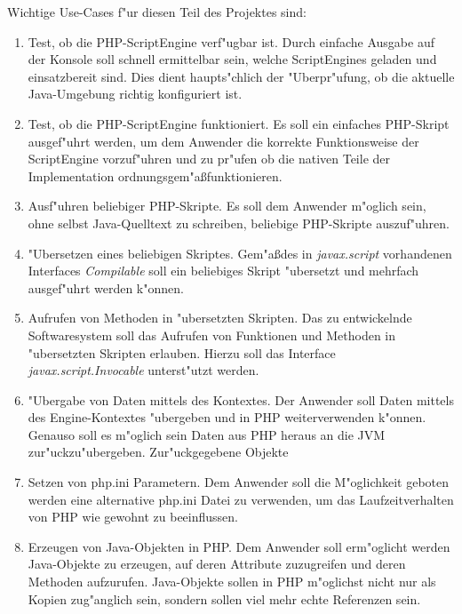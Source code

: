 Wichtige Use-Cases f"ur diesen Teil des Projektes sind:
\begin{enumerate}
\item Test, ob die PHP-ScriptEngine verf"ugbar ist. Durch einfache Ausgabe auf der Konsole soll schnell ermittelbar sein, welche
    ScriptEngines geladen und einsatzbereit sind. Dies dient haupts"chlich der "Uberpr"ufung, ob die aktuelle Java-Umgebung
    richtig konfiguriert ist.
\item Test, ob die PHP-ScriptEngine funktioniert. Es soll ein einfaches PHP-Skript ausgef"uhrt werden, um dem Anwender
    die korrekte Funktionsweise der ScriptEngine vorzuf"uhren und zu pr"ufen ob die nativen Teile der Implementation
    ordnungsgem"a\ss funktionieren.
\item Ausf"uhren beliebiger PHP-Skripte. Es soll dem Anwender m"oglich sein, ohne selbst Java-Quelltext zu schreiben, beliebige
    PHP-Skripte auszuf"uhren.
\item "Ubersetzen eines beliebigen Skriptes. Gem"a\ss des in \emph{javax.script} vorhandenen Interfaces \emph{Compilable} soll 
    ein beliebiges Skript "ubersetzt und mehrfach ausgef"uhrt werden k"onnen.
\item Aufrufen von Methoden in "ubersetzten Skripten. Das zu entwickelnde Softwaresystem soll das Aufrufen von Funktionen und
    Methoden in "ubersetzten Skripten erlauben. Hierzu soll das Interface \emph{javax.script.Invocable} unterst"utzt werden.
\item "Ubergabe von Daten mittels des Kontextes. Der Anwender soll Daten mittels des Engine-Kontextes "ubergeben und in PHP
    weiterverwenden k"onnen. Genauso soll es m"oglich sein Daten aus PHP heraus an die JVM zur"uckzu"ubergeben.
    Zur"uckgegebene Objekte
\item Setzen von php.ini Parametern. Dem Anwender soll die M"oglichkeit geboten werden eine alternative php.ini Datei zu verwenden,
    um das Laufzeitverhalten von PHP wie gewohnt zu beeinflussen.
\item Erzeugen von Java-Objekten in PHP. Dem Anwender soll erm"oglicht werden Java-Objekte zu erzeugen, auf deren
    Attribute zuzugreifen und deren Methoden aufzurufen. Java-Objekte sollen in PHP m"oglichst nicht nur als Kopien zug"anglich sein,
    sondern sollen viel mehr echte Referenzen sein.
\end{enumerate}
